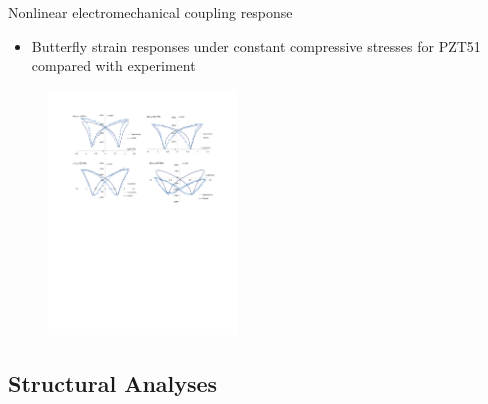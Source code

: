 \documentclass{beamer}
\begin{document}
\begin{frame}{Nonlinear electromechanical coupling response}
\fontsize{6pt}{6pt}
   \begin{itemize}
  \item Butterfly strain responses under constant compressive stresses for PZT51 compared with experiment \cite{raey}
  \end{itemize} 
  
\begin{figure}
\centering
\includegraphics[height=6.5cm]{../images/ButterflyStrainResponsesUnderConstantCompressiveStresses}

\label{fig:ButterStressPolSwitchingStrainZeroStressPZT51}
\end{figure}
\end{frame}


\subsection{Structural Analyses}
\end{document}
